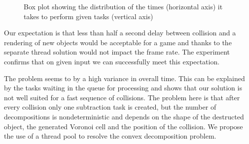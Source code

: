 \begin{figure}
\centering
{}
\caption{Box plot showing the distribution of the times (horizontal axis) it takes to perform given tasks (vertical axis)}
\label{fig:boxtimes}
\end{figure}



Our expectation is that less than half a second delay between collision and a rendering of new objects would be acceptable for a game and thanks to the separate thread solution would not impact the frame rate. The experiment confirms that on given input we can successfully meet this expectation.

The problem seems to by a high variance in overall time. This can be explained by the tasks waiting in the queue for processing and shows that our solution is not well suited for a fast sequence of collisions. The problem here is that after every collision only one subtraction task is created, but the number of decompositions is nondeterministic and depends on the shape of the destructed object, the generated Voronoi cell and the position of the collision. We propose the use of a thread pool to resolve the convex decomposition problem.

